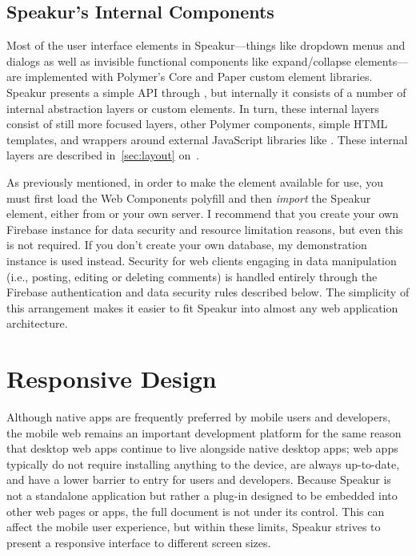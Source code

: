 \subsection{Speakur's Internal Components}
Most of the user interface elements in Speakur---things like dropdown menus and dialogs as well as invisible functional components like expand/collapse elements---are implemented with Polymer's Core and Paper custom element libraries.
Speakur presents a simple API through ,
but internally it consists of a number of internal abstraction layers or custom elements.
In turn, these internal layers consist of still more focused layers, other Polymer components, 
simple HTML templates, 
and wrappers around external JavaScript libraries 
like .
These internal layers are described in~\cref{sec:layout} on~.

As previously mentioned, in order to make the 
 element available for use, 
you must first load the Web Components polyfill and then \textit{import} the Speakur element, 
either from  or your own server.
I recommend that you create your own Firebase instance for data security and resource limitation reasons, but even this is not required. 
If you don't create your own database, my demonstration instance is used instead.
Security for web clients engaging in data manipulation 
(i.e., posting, editing or deleting comments) 
is handled entirely through the Firebase authentication 
and data security rules described below.
The simplicity of this arrangement makes it easier to fit Speakur into almost any web application architecture.

\section{Responsive Design}
\label{bg:mobile}
Although native apps are frequently preferred by mobile users and developers, 
the mobile web remains an important development platform for the same reason that 
desktop web apps continue to live alongside native desktop apps; 
web apps typically do not require installing anything to the device, are always up-to-date, and have a lower barrier to entry for users and developers.
Because Speakur is not a standalone application but rather a plug-in designed to be embedded into other web pages or apps, 
the full document is not under its control.
This can affect the mobile user experience,
but within these limits, Speakur strives to present a responsive interface to different screen sizes.

